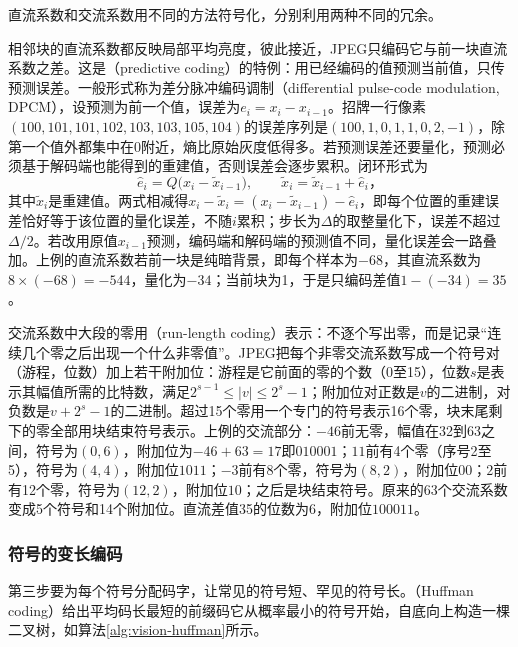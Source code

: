 直流系数和交流系数用不同的方法符号化，分别利用两种不同的冗余。

相邻块的直流系数都反映局部平均亮度，彼此接近，JPEG只编码它与前一块直流系数之差。这是（predictive coding）的特例：用已经编码的值预测当前值，只传预测误差。一般形式称为差分脉冲编码调制（differential pulse-code modulation, DPCM），设预测为前一个值，误差为$e_i=x_i-x_{i-1}$。招牌一行像素$(100,101,101,102,103,103,105,104)$的误差序列是$(100,1,0,1,1,0,2,-1)$，除第一个值外都集中在0附近，熵比原始灰度低得多。若预测误差还要量化，预测必须基于解码端也能得到的重建值，否则误差会逐步累积。闭环形式为
\begin{equation}
 \hat e_i=Q\bigl(x_i-\tilde x_{i-1}\bigr),\qquad
 \tilde x_i=\tilde x_{i-1}+\hat e_i\text{，}
 \label{eq:vision-dpcm}
\end{equation}
其中$\tilde x_i$是重建值。两式相减得$x_i-\tilde x_i=(x_i-\tilde x_{i-1})-\hat e_i$，即每个位置的重建误差恰好等于该位置的量化误差，不随$i$累积；步长为$\Delta$的取整量化下，误差不超过$\Delta/2$。若改用原值$x_{i-1}$预测，编码端和解码端的预测值不同，量化误差会一路叠加。上例的直流系数若前一块是纯暗背景，即每个样本为$-68$，其直流系数为$8\times(-68)=-544$，量化为$-34$；当前块为1，于是只编码差值$1-(-34)=35$。

交流系数中大段的零用（run-length coding）表示：不逐个写出零，而是记录“连续几个零之后出现一个什么非零值”。JPEG把每个非零交流系数写成一个符号对（游程，位数）加上若干附加位：游程是它前面的零的个数（0至15），位数$s$是表示其幅值所需的比特数，满足$2^{s-1}\leq|v|\leq2^s-1$；附加位对正数是$v$的二进制，对负数是$v+2^s-1$的二进制。超过15个零用一个专门的符号表示16个零，块末尾剩下的零全部用块结束符号表示。上例的交流部分：$-46$前无零，幅值在32到63之间，符号为$(0,6)$，附加位为$-46+63=17$即$010001$；$11$前有4个零（序号2至5），符号为$(4,4)$，附加位$1011$；$-3$前有8个零，符号为$(8,2)$，附加位$00$；$2$前有12个零，符号为$(12,2)$，附加位$10$；之后是块结束符号。原来的63个交流系数变成5个符号和14个附加位。直流差值35的位数为6，附加位$100011$。

\subsubsection{符号的变长编码}
\label{sec:vision-restoration-huffman}

第三步要为每个符号分配码字，让常见的符号短、罕见的符号长。（Huffman coding）给出平均码长最短的前缀码它从概率最小的符号开始，自底向上构造一棵二叉树，如算法\ref{alg:vision-huffman}所示。

